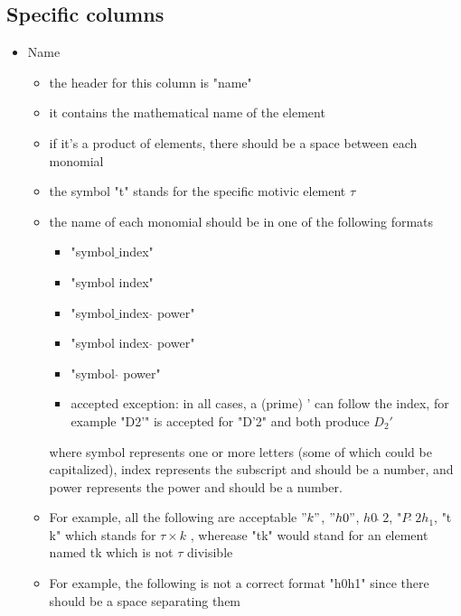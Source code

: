\documentclass[a4paper,11pt]{article}
\begin{document}
\subsection{Specific columns}	
\begin{itemize}

	\item{Name}
	\begin{itemize}
		\item the header for this column is "name"
		\item it contains the mathematical name of the element
		\item if it's a product of elements, there should be a space between each monomial
		\item the symbol "t" stands for the specific motivic element $\tau$
		\item the name of each monomial should be in one of the following formats
		\begin{itemize}
		\item "symbol$\_$index"
		\item "symbol index"
		\item "symbol$\_$index $\hat{}$ power"
		\item "symbol index $\hat{}$ power"
		\item "symbol $\hat{}$ power"
		\item accepted exception: in all cases, a (prime) ' can follow the index, for example "D2'" is accepted for "D'2" and both produce $D_2'$
		\end{itemize}		 
where symbol represents one or more letters (some of which could be capitalized), index represents the subscript and should be a number, and power represents the power and should be a number.
		\item For example, all the following are acceptable $" k "$, $" h0 "$, $h0 \ \hat{} \ 2$, "$P \ \hat{} \ 2 h_1$, "t k" which stands for $\tau \times k$  , wherease "tk" would stand for an element named tk which is not $\tau$ divisible
		\item For example, the following is not a correct format "h0h1" since there should be a space separating them
	\end{itemize}
	

\end{itemize}
\end{document}
